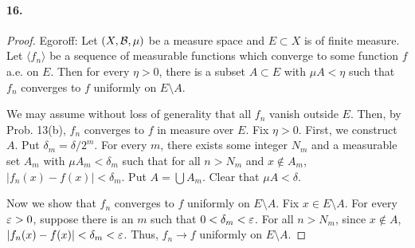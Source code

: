   \paragraph{16.}
  \begin{proof}
    Egoroff: Let $(X,\mathcal{B},\mu)$ be a measure space and $E\subset X$ is of
    finite measure. Let $\langle f_n\rangle$ be a sequence of measurable
    functions which converge to some function $f$ a.e. on $E$. Then
    for every $\eta>0$, there is a subset $A\subset E$ with $\mu A<\eta$ such
    that $f_n$ converges to $f$ uniformly on $E\setminus A$.\par
    We may assume without loss of generality that all $f_n$ vanish outside $E$.
    Then, by Prob. 13(b), $f_n$ converges to $f$ in measure over $E$. Fix 
    $\eta>0$. First, we construct $A$. Put $\delta_m=\delta/2^m$. For every 
    $m$, there exists some integer $N_m$ and a measurable set $A_m$ with $\mu
    A_m<\delta_m$ such that for all $n>N_m$ and $x\notin A_m$, $|f_n(x)-f(x)|<
    \delta_m$. Put $A=\bigcup A_m$. Clear that $\mu A<\delta$.\par
    Now we show that $f_n$ converges to $f$ uniformly on $E\setminus A$. Fix 
    $x\in E\setminus A$. For every $\varepsilon>0$, suppose there is an $m$ such that
    $0<\delta_m<\varepsilon$. For all $n>N_m$, since $x\notin A$, $|f_n(x)-f(x)|<
    \delta_m<\varepsilon$. Thus, $f_n\to f$ uniformly on $E\setminus A$.
  \end{proof}













